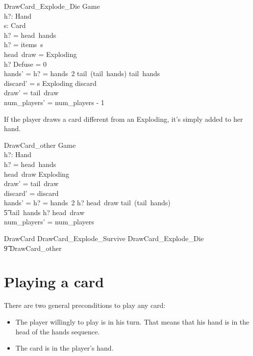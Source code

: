 \documentclass[11pt, fuzz]{article}
\begin{document}
\begin{schema}{DrawCard\_Explode\_Die}
    \Delta Game \\
    h?: Hand \\
    s: \seq Card \\
\where
    h? = head~hands \\
    h? = items~s \\
    head~draw = Exploding \\
    h? \bcount Defuse = 0 \\
    hands' = \IF h? = hands~2 \THEN tail~(tail~hands) \ELSE tail~hands \\
    discard' = s \cat \langle Exploding \rangle \cat discard \\
    draw' = tail~draw \\
    num\_players' = num\_players - 1
\end{schema}

If the player draws a card different from an Exploding, it's simply added to her hand. 

\begin{schema}{DrawCard\_other}
    \Delta Game \\
    h?: Hand \\
\where
    h? = head~hands \\
    head~draw \neq Exploding \\
    draw' = tail~draw \\
    discard' = discard \\
    hands' = \IF h? = hands~2 \THEN \langle h? \uplus \lbag head~draw \rbag \rangle \cat tail~(tail~hands)\\ \t5 \ELSE tail~hands \cat \langle h? \uplus \lbag head~draw \rbag \rangle \\
    num\_players' = num\_players
\end{schema}

\begin{zed}
    DrawCard  DrawCard\_Explode\_Survive \lor DrawCard\_Explode\_Die\\ \t9 \lor DrawCard\_other 
\end{zed}


\section{Playing a card}

There are two general preconditions to play any card:

\begin{itemize}
    \item The player willingly to play is in his turn. That means that his hand is in the head of the hands sequence. 
    \item The card is in the player's hand. 
\end{itemize}
\end{document}
